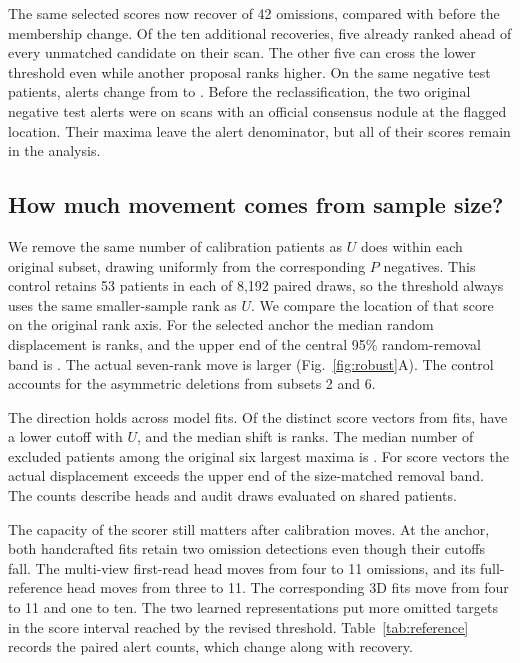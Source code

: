 The same selected scores now recover \PairHitsU{} of 42 omissions, compared with \PairHitsP{} before the membership change. Of the ten additional recoveries, five already ranked ahead of every unmatched candidate on their scan. The other five can cross the lower threshold even while another proposal ranks higher. On the same \UTest{} negative test patients, alerts change from \PairAlertsP{} to \PairAlertsU{}. Before the reclassification, the two original negative test alerts were on scans with an official consensus nodule at the flagged location. Their maxima leave the alert denominator, but all of their scores remain in the analysis.

\subsection{How much movement comes from sample size?}

We remove the same number of calibration patients as $U$ does within each original subset, drawing uniformly from the corresponding $P$ negatives. This control retains 53 patients in each of 8,192 paired draws, so the threshold always uses the same smaller-sample rank as $U$. We compare the location of that score on the original rank axis. For the selected anchor the median random displacement is \PairRobustMedian{} ranks, and the upper end of the central 95\% random-removal band is \PairControlHi. The actual seven-rank move is larger (Fig.~\ref{fig:robust}A). The control accounts for the asymmetric deletions from subsets 2 and 6.

The direction holds across model fits. Of the \NHeads{} distinct score vectors from \NHeadRows{} fits, \LowerHeads{} have a lower cutoff with $U$, and the median shift is \MedianDrop{} ranks. The median number of excluded patients among the original six largest maxima is \TopRemoved. For \PastBand{} score vectors the actual displacement exceeds the upper end of the size-matched removal band. The counts describe heads and audit draws evaluated on shared patients.

The capacity of the scorer still matters after calibration moves. At the anchor, both handcrafted fits retain two omission detections even though their cutoffs fall. The multi-view first-read head moves from four to 11 omissions, and its full-reference head moves from three to 11. The corresponding 3D fits move from four to 11 and one to ten. The two learned representations put more omitted targets in the score interval reached by the revised threshold. Table~\ref{tab:reference} records the paired alert counts, which change along with recovery.

